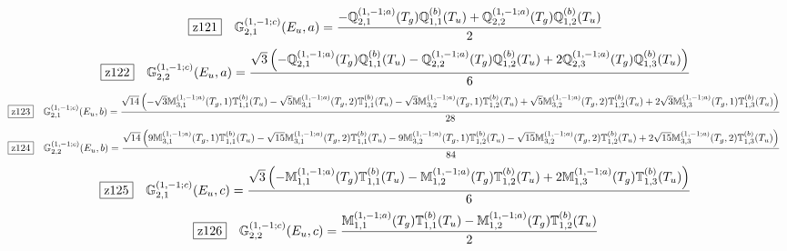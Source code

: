 \documentclass[fleqn,10pt,landscape]{jsarticle}
\begin{document}
\begin{dmath*}
\hspace*{3mm}\fbox{z121}\quad \mathbb{G}_{2,1}^{(1,-1;c)}(E_{u},a)=\frac{- \mathbb{Q}_{2,1}^{(1,-1;a)}(T_{g}) \mathbb{Q}_{1,1}^{(b)}(T_{u}) + \mathbb{Q}_{2,2}^{(1,-1;a)}(T_{g}) \mathbb{Q}_{1,2}^{(b)}(T_{u})}{2}
\end{dmath*}
\begin{dmath*}
\hspace*{3mm}\fbox{z122}\quad \mathbb{G}_{2,2}^{(1,-1;c)}(E_{u},a)=\frac{\sqrt{3} \left(- \mathbb{Q}_{2,1}^{(1,-1;a)}(T_{g}) \mathbb{Q}_{1,1}^{(b)}(T_{u}) - \mathbb{Q}_{2,2}^{(1,-1;a)}(T_{g}) \mathbb{Q}_{1,2}^{(b)}(T_{u}) + 2 \mathbb{Q}_{2,3}^{(1,-1;a)}(T_{g}) \mathbb{Q}_{1,3}^{(b)}(T_{u})\right)}{6}
\end{dmath*}
\begin{dmath*}
\hspace*{3mm}\fbox{z123}\quad \mathbb{G}_{2,1}^{(1,-1;c)}(E_{u},b)=\frac{\sqrt{14} \left(- \sqrt{3} \mathbb{M}_{3,1}^{(1,-1;a)}(T_{g},1) \mathbb{T}_{1,1}^{(b)}(T_{u}) - \sqrt{5} \mathbb{M}_{3,1}^{(1,-1;a)}(T_{g},2) \mathbb{T}_{1,1}^{(b)}(T_{u}) - \sqrt{3} \mathbb{M}_{3,2}^{(1,-1;a)}(T_{g},1) \mathbb{T}_{1,2}^{(b)}(T_{u}) + \sqrt{5} \mathbb{M}_{3,2}^{(1,-1;a)}(T_{g},2) \mathbb{T}_{1,2}^{(b)}(T_{u}) + 2 \sqrt{3} \mathbb{M}_{3,3}^{(1,-1;a)}(T_{g},1) \mathbb{T}_{1,3}^{(b)}(T_{u})\right)}{28}
\end{dmath*}
\begin{dmath*}
\hspace*{3mm}\fbox{z124}\quad \mathbb{G}_{2,2}^{(1,-1;c)}(E_{u},b)=\frac{\sqrt{14} \left(9 \mathbb{M}_{3,1}^{(1,-1;a)}(T_{g},1) \mathbb{T}_{1,1}^{(b)}(T_{u}) - \sqrt{15} \mathbb{M}_{3,1}^{(1,-1;a)}(T_{g},2) \mathbb{T}_{1,1}^{(b)}(T_{u}) - 9 \mathbb{M}_{3,2}^{(1,-1;a)}(T_{g},1) \mathbb{T}_{1,2}^{(b)}(T_{u}) - \sqrt{15} \mathbb{M}_{3,2}^{(1,-1;a)}(T_{g},2) \mathbb{T}_{1,2}^{(b)}(T_{u}) + 2 \sqrt{15} \mathbb{M}_{3,3}^{(1,-1;a)}(T_{g},2) \mathbb{T}_{1,3}^{(b)}(T_{u})\right)}{84}
\end{dmath*}
\begin{dmath*}
\hspace*{3mm}\fbox{z125}\quad \mathbb{G}_{2,1}^{(1,-1;c)}(E_{u},c)=\frac{\sqrt{3} \left(- \mathbb{M}_{1,1}^{(1,-1;a)}(T_{g}) \mathbb{T}_{1,1}^{(b)}(T_{u}) - \mathbb{M}_{1,2}^{(1,-1;a)}(T_{g}) \mathbb{T}_{1,2}^{(b)}(T_{u}) + 2 \mathbb{M}_{1,3}^{(1,-1;a)}(T_{g}) \mathbb{T}_{1,3}^{(b)}(T_{u})\right)}{6}
\end{dmath*}
\begin{dmath*}
\hspace*{3mm}\fbox{z126}\quad \mathbb{G}_{2,2}^{(1,-1;c)}(E_{u},c)=\frac{\mathbb{M}_{1,1}^{(1,-1;a)}(T_{g}) \mathbb{T}_{1,1}^{(b)}(T_{u}) - \mathbb{M}_{1,2}^{(1,-1;a)}(T_{g}) \mathbb{T}_{1,2}^{(b)}(T_{u})}{2}
\end{dmath*}
\end{document}
